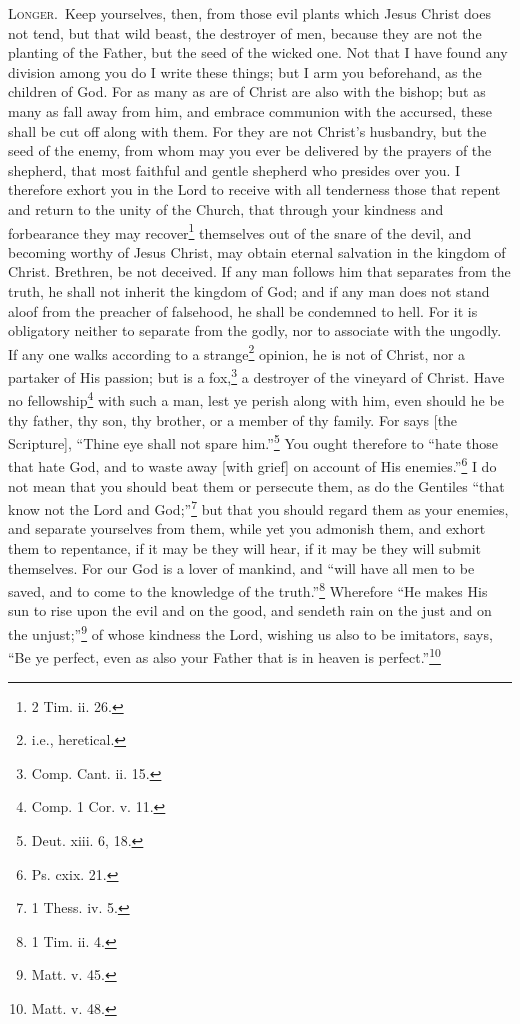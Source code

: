 \textsc{Longer.}~Keep yourselves, then, from those evil plants which Jesus Christ does not tend, but that wild beast, the destroyer of men, because they are not the planting of the Father, but the seed of the wicked one. Not that I have found any division among you do I write these things; but I arm you beforehand, as the children of God. For as many as are of Christ are also with the bishop; but as many as fall away from him, and embrace communion with the accursed, these shall be cut off along with them. For they are not Christ’s husbandry, but the seed of the enemy, from whom may you ever be delivered by the prayers of the shepherd, that most faithful and gentle shepherd who presides over you. I therefore exhort you in the Lord to receive with all tenderness those that repent and return to the unity of the Church, that through your kindness and forbearance they may recover\footnote{2 Tim. ii. 26.} themselves out of the snare of the devil, and becoming worthy of Jesus Christ, may obtain eternal salvation in the kingdom of Christ. Brethren, be not deceived. If any man follows him that separates from the truth, he shall not inherit the kingdom of God; and if any man does not stand aloof from the preacher of falsehood, he shall be condemned to hell. For it is obligatory neither to separate from the godly, nor to associate with the ungodly. If any one walks according to a strange\footnote{i.e., heretical.} opinion, he is not of Christ, nor a partaker of His passion; but is a fox,\footnote{Comp.  Cant. ii. 15.} a destroyer of the vineyard of Christ. Have no fellowship\footnote{Comp. 1 Cor. v. 11.} with such a man, lest ye perish along with him, even should he be thy father, thy son, thy brother, or a member of thy family. For says [the Scripture], “Thine eye shall not spare him.”\footnote{Deut. xiii. 6, 18.} You ought therefore to “hate those that hate God, and to waste away [with grief] on account of His enemies.”\footnote{Ps. cxix. 21.} I do not mean that you should beat them or persecute them, as do the Gentiles “that know not the Lord and God;”\footnote{1 Thess. iv. 5.} but that you should regard them as your enemies, and separate yourselves from them, while yet you admonish them, and exhort them to repentance, if it may be they will hear, if it may be they will submit themselves. For our God is a lover of mankind, and “will have all men to be saved, and to come to the knowledge of the truth.”\footnote{1 Tim. ii. 4.} Wherefore “He makes His sun to rise upon the evil and on the good, and sendeth rain on the just and on the unjust;”\footnote{Matt. v. 45.} of whose kindness the Lord, wishing us also to be imitators, says, “Be ye perfect, even as also your Father that is in heaven is perfect.”\footnote{Matt. v. 48.}

